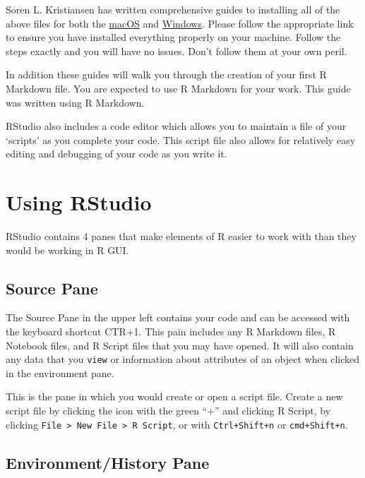 \documentclass[]{book}
\begin{document}
Soren L. Kristiansen has written comprehensive guides to installing all of the above files for both the \href{https://medium.com/@sorenlind/create-pdf-reports-using-r-r-markdown-latex-and-knitr-on-macos-high-sierra-e7b5705c9fd}{macOS} and \href{https://medium.com/@sorenlind/create-pdf-reports-using-r-r-markdown-latex-and-knitr-on-windows-10-952b0c48bfa9}{Windows}. Please follow the appropriate link to ensure you have installed everything properly on your machine. Follow the steps exactly and you will have no issues. Don't follow them at your own peril.

In addition these guides will walk you through the creation of your first R Markdown file. You are expected to use R Markdown for your work. This guide was written using R Markdown.

RStudio also includes a code editor which allows you to maintain a file of your `scripts' as you complete your code. This script file also allows for relatively easy editing and debugging of your code as you write it.

\hypertarget{using-rstudio}{%
\section{Using RStudio}\label{using-rstudio}}

RStudio contains 4 panes that make elements of R easier to work with than they would be working in R GUI.

\hypertarget{source-pane}{%
\subsection{Source Pane}\label{source-pane}}

The Source Pane in the upper left contains your code and can be accessed with the keyboard shortcut CTR+1. This pain includes any R Markdown files, R Notebook files, and R Script files that you may have opened. It will also contain any data that you \texttt{view} or information about attributes of an object when clicked in the environment pane.

This is the pane in which you would create or open a script file. Create a new script file by clicking the icon with the green ``+'' and clicking R Script, by clicking \texttt{File\ \textgreater{}\ New\ File\ \textgreater{}\ R\ Script}, or with \texttt{Ctrl+Shift+n} or \texttt{cmd+Shift+n}.

\hypertarget{environmenthistory-pane}{%
\subsection{Environment/History Pane}\label{environmenthistory-pane}}
\end{document}
